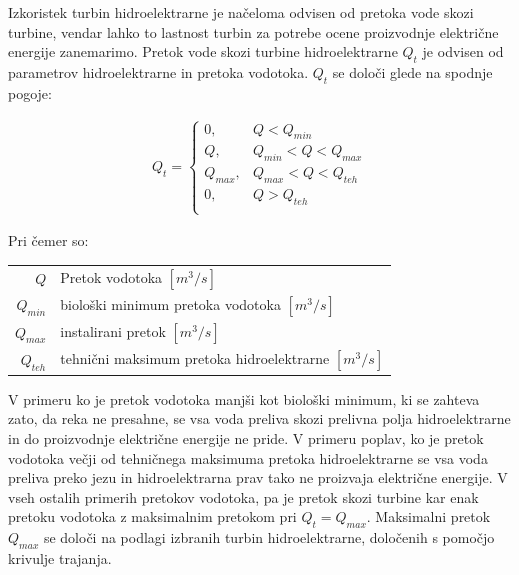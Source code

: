 
Izkoristek turbin hidroelektrarne je načeloma odvisen od pretoka vode skozi turbine, vendar lahko to lastnost turbin za potrebe ocene proizvodnje električne energije zanemarimo. Pretok vode skozi turbine hidroelektrarne $Q_t$ je odvisen od parametrov hidroelektrarne in pretoka vodotoka. $Q_t$ se določi glede na spodnje pogoje:

\begin{ceqn}
	\begin{align}
	Q_t = \begin{cases}
	0, &Q < Q_{min}\\
	Q, &Q_{min} < Q < Q_{max}\\
	Q_{max}, &Q_{max}< Q < Q_{teh}\\
	0, &Q > Q_{teh}\\
	\end{cases}
	\end{align}
\end{ceqn}

Pri čemer so:
\begin{table}[htb!]
	\begin{tabular}{r|p{10cm}}
		$Q$ & Pretok vodotoka $\left[m^3/s \right]$\\
		$Q_{min}$ & biološki minimum pretoka vodotoka $\left[m^3/s \right]$ \\
		$Q_{max}$ & instalirani pretok $\left[m^3/s \right]$ \\
		$Q_{teh}$ & tehnični maksimum pretoka hidroelektrarne $\left[m^3/s \right]$ \\
	\end{tabular}
\end{table}

V primeru ko je pretok vodotoka manjši kot biološki minimum, ki se zahteva zato, da reka ne presahne, se vsa voda preliva skozi prelivna polja hidroelektrarne in do proizvodnje električne energije ne pride. V primeru poplav, ko je pretok vodotoka večji od tehničnega maksimuma pretoka hidroelektrarne se vsa voda preliva preko jezu in hidroelektrarna prav tako ne proizvaja električne energije. V vseh ostalih primerih pretokov vodotoka, pa je pretok skozi turbine kar enak pretoku vodotoka z maksimalnim pretokom pri $Q_t = Q_{max}$. Maksimalni pretok $Q_{max}$ se določi na podlagi izbranih turbin hidroelektrarne, določenih s pomočjo krivulje trajanja.


